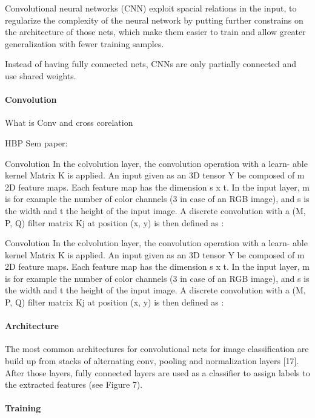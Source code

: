 Convolutional neural networks (CNN) exploit spacial relations in the input, to regularize the complexity of the neural network by putting further constrains on the architecture of those nets, which make them easier to train and allow greater generalization with fewer training samples.


Instead of having fully connected nets, CNNs are only partially connected and use shared weights.    

\paragraph{Convolution}

What is Conv and cross corelation

HBP Sem paper:

Convolution In the colvolution layer, the convolution operation with a learn-
able kernel Matrix K is applied. An input given as an 3D tensor Y be composed
of m 2D feature maps. Each feature map has the dimension s x t. In the input
layer, m is for example the number of color channels (3 in case of an RGB image),
and s is the width and t the height of the input image. A discrete convolution
with a (M, P, Q) filter matrix Kj at position (x, y) is then defined as :


Convolution In the colvolution layer, the convolution operation with a learn-
able kernel Matrix K is applied. An input given as an 3D tensor Y be composed
of m 2D feature maps. Each feature map has the dimension s x t. In the input
layer, m is for example the number of color channels (3 in case of an RGB image),
and s is the width and t the height of the input image. A discrete convolution
with a (M, P, Q) filter matrix Kj at position (x, y) is then defined as :



\paragraph{Architecture}

The most common architectures for convolutional nets for image classification
are build up from stacks of alternating conv, pooling and normalization layers
[17]. After those layers, fully connected layers are used as a classifier to assign
labels to the extracted features (see Figure 7).


\paragraph{Training}

